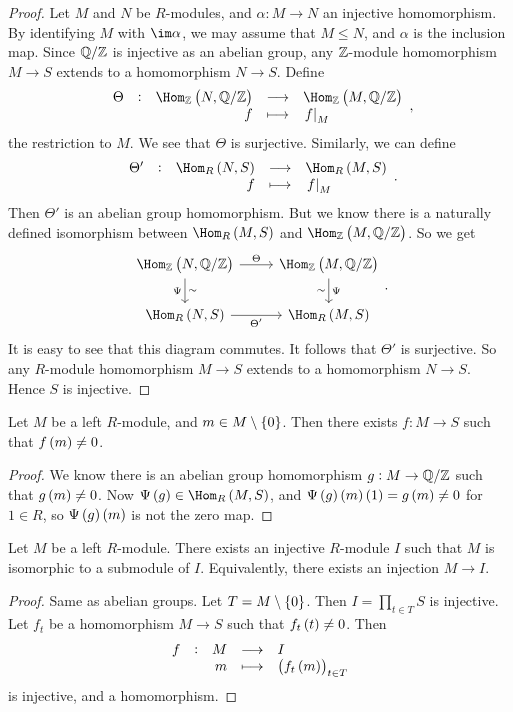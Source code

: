 \begin{proof}
Let $ M $ and $ N $ be $ R $-modules, and $ \alpha : M \to N $ an injective homomorphism. By identifying $ M $ with $ \im \alpha $, we may assume that $ M \le N $, and $ \alpha $ is the inclusion map. Since $ \mathbb{Q} / \mathbb{Z} $ is injective as an abelian group, any $ \mathbb{Z} $-module homomorphism $ M \to S $ extends to a homomorphism $ N \to S $. Define
$$ \function[\Theta]{\Hom_\ZZ\br{N, \QQ / \ZZ}}{\Hom_\ZZ\br{M, \QQ / \ZZ}}{f}{\eval{f}_M}, $$
the restriction to $ M $. We see that $ \Theta $ is surjective. Similarly, we can define
$$ \function[\Theta']{\Hom_R\br{N, S}}{\Hom_R\br{M, S}}{f}{\eval{f}_M}. $$
Then $ \Theta' $ is an abelian group homomorphism. But we know there is a naturally defined isomorphism between $ \Hom_R\br{M, S} $ and $ \Hom_\ZZ\br{M, \QQ / \ZZ} $. So we get
$$
\begin{tikzcd}
\Hom_\ZZ\br{N, \QQ / \ZZ} \arrow{r}{\Theta} \arrow{d}{\sim}[swap]{\Psi} & \Hom_\ZZ\br{M, \QQ / \ZZ} \arrow{d}{\Psi}[swap]{\sim} \\
\Hom_R\br{N, S} \arrow{r}[swap]{\Theta'} & \Hom_R\br{M, S}
\end{tikzcd}.
$$
It is easy to see that this diagram commutes. It follows that $ \Theta' $ is surjective. So any $ R $-module homomorphism $ M \to S $ extends to a homomorphism $ N \to S $. Hence $ S $ is injective.
\end{proof}

\pagebreak

\begin{proposition}
Let $ M $ be a left $ R $-module, and $ m \in M \setminus \cbr{0} $. Then there exists $ f : M \to S $ such that $ f\br{m} \ne 0 $.
\end{proposition}

\begin{proof}
We know there is an abelian group homomorphism $ g : M \to \mathbb{Q} / \mathbb{Z} $ such that $ g\br{m} \ne 0 $. Now $ \Psi\br{g} \in \Hom_R\br{M, S} $, and $ \Psi\br{g}\br{m}\br{1} = g\br{m} \ne 0 $ for $ 1 \in R $, so $ \Psi\br{g}\br{m} $ is not the zero map.
\end{proof}

\begin{proposition}
Let $ M $ be a left $ R $-module. There exists an injective $ R $-module $ I $ such that $ M $ is isomorphic to a submodule of $ I $. Equivalently, there exists an injection $ M \to I $.
\end{proposition}

\begin{proof}
Same as abelian groups. Let $ T = M \setminus \cbr{0} $. Then $ I = \prod_{t \in T} S $ is injective. Let $ f_t $ be a homomorphism $ M \to S $ such that $ f_t\br{t} \ne 0 $. Then
$$ \function[f]{M}{I}{m}{\br{f_t\br{m}}_{t \in T}} $$
is injective, and a homomorphism.
\end{proof}

